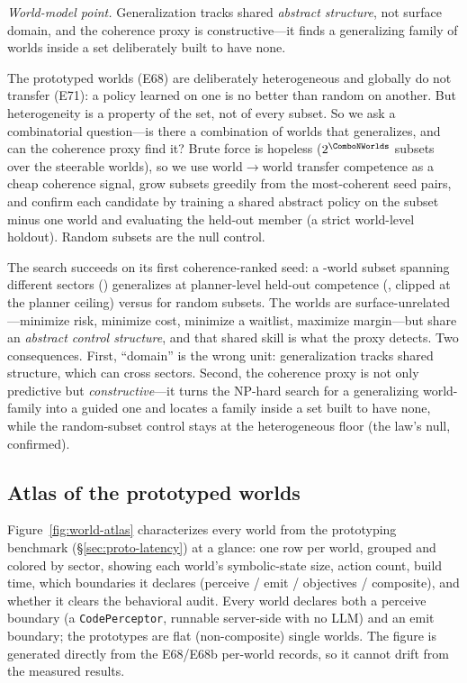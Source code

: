 \documentclass[11pt]{article}
\begin{document}
\emph{World-model point.} Generalization tracks shared \emph{abstract structure}, not surface
domain, and the coherence proxy is constructive---it finds a generalizing family of worlds inside
a set deliberately built to have none.

The \ProtoNumWorlds{} prototyped worlds (E68) are deliberately heterogeneous and globally do not
transfer (E71): a policy learned on one is no better than random on another. But heterogeneity is
a property of the set, not of every subset. So we ask a combinatorial question---is
there a combination of worlds that generalizes, and can the coherence proxy find
it? Brute force is hopeless ($2^{\ComboNWorlds}$ subsets over the \ComboNWorlds{} steerable
worlds), so we use world$\to$world transfer competence as a cheap coherence signal, grow subsets
greedily from the most-coherent seed pairs, and confirm each candidate by training a shared
abstract policy on the subset minus one world and evaluating the held-out member (a strict
world-level holdout). Random subsets are the null control.

The search succeeds on its first coherence-ranked seed: a \ComboSize{}-world subset
spanning \ComboNSectors{} different sectors (\texttt{\ComboWorlds}) generalizes at planner-level
held-out competence (\ComboHeldout, clipped at the planner ceiling) versus \ComboBaseline{} for
random subsets. The worlds are surface-unrelated---minimize risk, minimize cost, minimize a
waitlist, maximize margin---but share an \emph{abstract control structure}, and that shared skill
is what the proxy detects. Two consequences. First, ``domain'' is the wrong unit: generalization
tracks shared structure, which can cross sectors. Second, the coherence proxy is not only
predictive but \emph{constructive}---it turns the NP-hard search for a generalizing world-family
into a guided one and locates a family inside a set built to have none, while the random-subset
control stays at the heterogeneous floor (the law's null, confirmed).

\subsection{Atlas of the \ProtoNumWorlds{} prototyped worlds}\label{sec:world-atlas}
Figure~\ref{fig:world-atlas} characterizes every world from the prototyping benchmark
(\S\ref{sec:proto-latency}) at a glance: one row per world, grouped and colored by sector,
showing each world's symbolic-state size, action count, build time, which boundaries it
declares (perceive / emit / objectives / composite), and whether it clears the behavioral
audit. Every world declares both a perceive boundary (a \texttt{CodePerceptor}, runnable
server-side with no LLM) and an emit boundary; the prototypes are flat (non-composite)
single worlds. The figure is generated directly from the E68/E68b per-world records, so it
cannot drift from the measured results.
\end{document}

